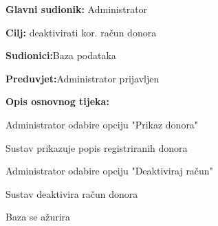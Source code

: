 \noindent {}
\begin{packed_item}
	
	\item \textbf{Glavni sudionik: }{Administrator}
	\item  \textbf{Cilj:} {deaktivirati kor. račun donora}
	\item  \textbf{Sudionici:}{Baza podataka}
	\item  \textbf{Preduvjet:}{Administrator prijavljen}
	\item  \textbf{Opis osnovnog tijeka:}
	
	\item[] \begin{packed_enum}
		
		\item {Administrator odabire opciju "Prikaz donora"}
		\item {Sustav prikazuje popis registriranih donora} 
		\item {Administrator odabire opciju "Deaktiviraj račun"}
		\item {Sustav deaktivira račun donora}
		\item {Baza se ažurira}
	\end{packed_enum}
	
\end{packed_item}


\noindent {}

